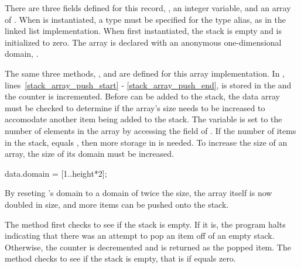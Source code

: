 There are three fields defined for this  record, ,
an integer variable,  and an array  of .
When  is instantiated, a type must be specified for the type alias,
 as in the linked list implementation.  When first instantiated,
the stack is empty and  is initialized to zero.   The 
array is declared with an anonymous one-dimensional domain, \chpl{[1..2]}.

The same three methods, ,  and  are
defined for this array implementation.  In , lines~\ref{stack_array_push_start}
- \ref{stack_array_push_end},  is stored in the 
and the  counter is incremented.  Before  can be added
to the stack, the data array must be checked to determine if the array's size
needs to be increased to accomodate another item being added to the stack.
The variable  is set to the number of
elements in the  array by accessing the  field
of .  If the number of items in the stack,  equals
, then more storage in  is needed.  To increase the
size of an array, the size of its domain must be increased.
\begin{chapel}
      data.domain = [1..height*2];  
\end{chapel}
By reseting 's
domain to a domain of twice the size, the array  itself is now doubled in size,
and more items can be pushed onto the stack. 

The  method first checks to see if the stack is empty.  If it is, the program
halts indicating that there was an attempt to pop an item off of an empty stack.
Otherwise, the  counter is decremented and 
is returned as the popped item.  The  method checks to see if
the stack is empty, that is if  equals zero.


